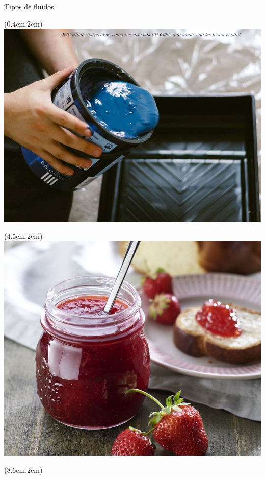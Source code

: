 \documentclass [xcolor=svgnames, t] {beamer}
\begin{document}
\begin{frame}{Tipos de fluidos}
\begin{textblock*}{4cm}(0.4cm,2cm) %
\includegraphics[width=\textwidth]{fnonew}
\end{textblock*}
\begin{textblock*}{4cm}(4.5cm,2cm) %
\includegraphics[width=\textwidth]{fnonew3}
\end{textblock*}
\begin{textblock*}{4cm}(8.6cm,2cm) %

\end{textblock*}
\end{frame}
\end{document}
